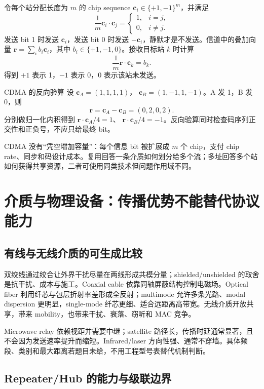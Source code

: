 \documentclass[UTF8,fontset=none,11pt,a4paper]{ctexart}
\begin{document}
令每个站分配长度为 \(m\) 的 chip sequence
\(\mathbf c_i\in\{+1,-1\}^m\)，并满足
\[
\frac1m\mathbf c_i\cdot\mathbf c_j=
\begin{cases}
1,&i=j,\\
0,&i\ne j.
\end{cases}
\]
发送 bit 1 时发送 \(\mathbf c_i\)，发送 bit 0 时发送 \(-\mathbf c_i\)，静默才是不发送。信道中的叠加向量
\(\mathbf r=\sum_i b_i\mathbf c_i\)，其中 \(b_i\in\{+1,-1,0\}\)。接收目标站 \(k\) 时计算
\[
\frac1m\mathbf r\cdot\mathbf c_k=b_k.
\]
得到 \(+1\) 表示 1，\(-1\) 表示 0，0 表示该站未发送。

\begin{examplebox}{CDMA 的反向验算}
设 \(\mathbf c_A=(1,1,1,1)\)，
\(\mathbf c_B=(1,-1,1,-1)\)。A 发 1，B 发 0，则
\[
\mathbf r=\mathbf c_A-\mathbf c_B=(0,2,0,2).
\]
分别做归一化内积得到
\(\mathbf r\cdot\mathbf c_A/4=1\)、
\(\mathbf r\cdot\mathbf c_B/4=-1\)。反向验算同时检查码序列正交性和正负号，不应只给最终 bit。
\end{examplebox}

CDMA 没有“凭空增加容量”：每个信息 bit 被扩展成 \(m\) 个 chip，支付 chip rate、同步和码设计成本。复用回答一条介质如何划分给多个流；多址回答多个站如何获得共享资源，二者可使用同类技术但问题作用域不同。

\section{介质与物理设备：传播优势不能替代协议能力}

\subsection{有线与无线介质的可生成比较}

双绞线通过绞合让外界干扰尽量在两线形成共模分量；shielded/unshielded 的取舍是抗干扰、成本与施工。Coaxial cable 依靠同轴屏蔽结构控制电磁场。Optical fiber 利用纤芯与包层折射率差形成全反射；multimode 允许多条光路、modal dispersion 更明显，single-mode 纤芯更细、适合远距离高带宽。无线介质开放共享，带来 mobility，也带来干扰、衰落、窃听和 MAC 竞争。

Microwave relay 依赖视距并需要中继；satellite 路径长，传播时延通常显著，且不会因为发送速率提升而缩短。Infrared/laser 方向性强、通常不穿墙。具体频段、类别和最大距离若题目未给，不用工程型号表替代机制判断。

\subsection{Repeater/Hub 的能力与级联边界}
\end{document}
